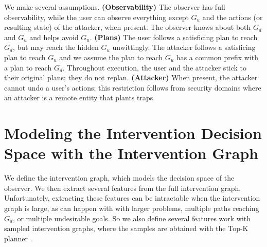 \documentclass[letterpaper]{article}
\newcommand{\frommak}[1]{\frombody{ForestGreen}{Mak}{#1}}
\newcommand{\frombody}[3]{\noindent\textcolor{#1}{{$\bf [\![\!\![$}\underline{\scshape{#2}} {\scshape says:} \textsl{#3}{$\bf ]\!\!]\!]$}}}
\theoremstyle{plain}
\begin{document}
We make several assumptions.
\textbf{(Observability)} 
The observer has full observability, while the user can observe everything except $G_u$ and the actions (or resulting state) of the attacker, when present.
The observer knows about both $G_d$ and $G_u$ and helps avoid $G_u$.
\textbf{(Plans)} 
The user follows a satisficing plan to reach $G_d$, but may reach the hidden $G_u$ unwittingly. 
The attacker follows a satisficing plan to reach $G_u$ and we assume the plan to reach $G_u$ has a common prefix with a plan to reach $G_d$. 
Throughout execution, the user and the attacker stick to their original plans; they do not replan.
\textbf{(Attacker)}
When present, the attacker cannot undo a user's actions; this restriction follows from security domains where an attacker is a remote entity that plants traps.




\section{Modeling the Intervention Decision Space with the Intervention Graph}
\label{sec:stategraph}
We define the intervention graph, which models the decision space of the observer.
We then extract several features from the full intervention graph.
Unfortunately, extracting these features can be intractable when the intervention graph is large, as can happen with with larger problems, multiple paths reaching $G_d$, or multiple undesirable goals. So we also define several features work with sampled intervention graphs, where the samples are obtained with the Top-K planner \cite{riabov2014}.
\end{document}
